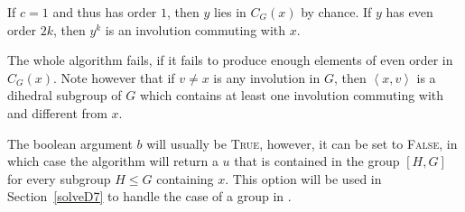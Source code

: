 If $c=1$ and thus has order $1$, then $y$ lies in
$C_G(x)$ by chance. If $y$ has even order $2k$, then $y^k$ is an
involution commuting with $x$.

The whole algorithm fails, if it fails to produce enough elements of
even order in $C_G(x)$. Note however that if $v \neq x$ is any
involution in $G$, then $\left< x,v \right>$ is a
dihedral subgroup of $G$ which contains at least one
involution commuting with and different from $x$.
\proofend

\begin{Rem}
The boolean argument $b$ will usually
be \textsc{True}, however, it can be set to
\textsc{False}, in which case the algorithm will return a $u$ 
that is contained in the group $[H,G]$ for
every subgroup $H \le G$ containing $x$. 
This option will be used in Section~\ref{solveD7} to handle the case
of a group in .
\end{Rem}

